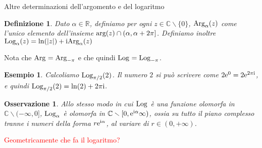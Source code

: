 \documentclass[11pt]{book}
\theoremstyle{Definizione}
\newtheorem*{mydef}{Definizione}
\theoremstyle{TeoremaProposizioneLemmaCorollarioCongettura}
\theoremstyle{OsservazioneNotaEsempio}
\newtheorem{myobs}{Osservazione}[section]
\newtheorem{myes}{Esempio}[section]
\newcommand{\R}{\mathbb{R}}
\newcommand{\C}{\mathbb{C}}
\newcommand{\tolto}{\smallsetminus}
\renewcommand{\arg}{\textup{arg}}
\newcommand{\Arg}[1][]{\textup{Arg}_{#1}}
\renewcommand{\i}{\textup{i}}
\newcommand{\e}{\textup{e}}
\newcommand{\Log}[1][]{\textup{Log}_{#1}}
\begin{document}
\begin{boxdef}{Altre determinazioni dell'argomento e del logaritmo}
\begin{mydef}
Dato $\alpha\in \R$, definiamo per ogni $z\in \C\tolto \{0\}$, $\Arg[\alpha](z)$ come l'unico elemento dell'insieme $\arg(z) \cap (\alpha,\alpha+2\pi]$. Definiamo inoltre $\Log[\alpha](z) = \ln(|z|) + \i \Arg[\alpha](z)$
\end{mydef}
\end{boxdef}
\noindent
Nota che $\Arg = \Arg[-\pi]$ e che quindi $\Log = \Log[-\pi]$.
\begin{myes}
Calcoliamo $\Log[\pi/2](2)$. Il numero $2$ si può scrivere come $2 \e^{0} = 2 \e^{2\pi\i}$, e quindi $\Log[\pi/2](2) = \ln(2)+2\pi\i$.
\end{myes}
\begin{myobs}
Allo stesso modo in cui $\Log$ è una funzione olomorfa in $\C \tolto (-\infty,0]$, $\Log[\alpha]$ è olomorfa in $\C \tolto [0,\e^{\i\alpha}\infty)$, ossia su tutto il piano complesso tranne i numeri della forma $r\e^{\i\alpha}$, al variare di $r\in (0,+\infty)$.
\end{myobs}
\textcolor{red}{Geometricamente che fa il logaritmo?}
\end{document}
